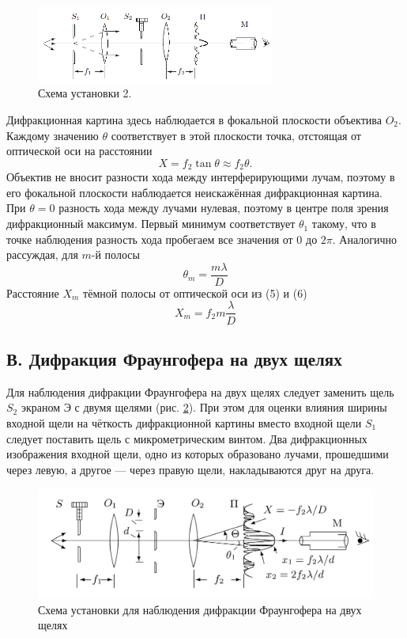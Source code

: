 \documentclass[12pt, a4paper]{article}
\begin{document}
\begin{figure}[h]
  \includegraphics[width = 0.7\textwidth]{pics/3.png}
  \centering
  \caption{Схема установки 2.}
  \label{pic:setup-2}
\end{figure}
Дифракционная картина здесь наблюдается в фокальной плоскости объектива $O_2$. Каждому значению $\theta$ соответствует в этой плоскости точка, отстоящая от оптической оси на расстоянии
\begin{equation}
  X = f_2 \tan \theta \approx f_2 \theta.
\end{equation}
Объектив не вносит разности хода между интерферирующими лучам, поэтому в его фокальной плоскости наблюдается неискажённая дифракционная картина. При $\theta = 0$ разность хода между лучами нулевая, поэтому в центре поля зрения дифракционный максимум. Первый минимум соответствует $\theta_1$ такому, что в точке наблюдения разность хода пробегаем все значения от 0 до $2\pi$. Аналогично рассуждая, для $m$-й полосы
\begin{equation}
  \theta_m = \frac{m \lambda}{D}
\end{equation}
Расстояние $X_m$ тёмной полосы от оптической оси из (5) и (6)
\begin{equation}
  X_m = f_2m\frac{\lambda}{D}
\end{equation}

\subsection*{В. Дифракция Фраунгофера на двух щелях}

Для наблюдения дифракции Фраунгофера на двух щелях следует заменить щель $ S_2 $ экраном Э с двумя щелями
(рис. \ref{pic:labC}). При этом для оценки влияния ширины входной щели на чёткость дифракционной картины
вместо входной щели $ S_1 $ следует поставить щель с микрометрическим винтом. Два дифракционных изображения
входной щели, одно из которых образовано лучами, прошедшими через левую, а другое --- через правую щели,
накладываются друг на друга.

\begin{figure}[H]
  \centering
  \includegraphics[width=0.7\linewidth]{pics/setup_c.jpeg}
  \caption{Схема установки для наблюдения дифракции Фраунгофера на двух щелях}
  \label{pic:labC}
\end{figure}
\end{document}
